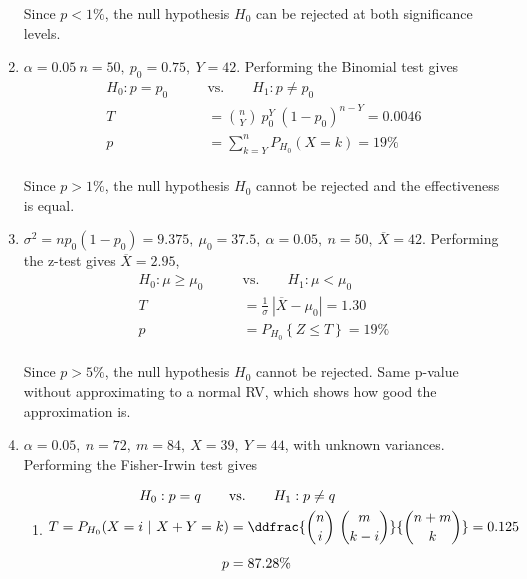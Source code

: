 \begin{enumerate}
	Since $ p < 1\% $, the null hypothesis $ H_0 $ can be rejected at both significance levels.\\
	
	\item $\alpha = 0.05\ n = 50,\ p_0 = 0.75,\ Y = 42$. Performing the Binomial test gives\\
	
	\begin{align}
		H_0 : p = p_0 \qquad &\text{vs.} \qquad H_1 : p \neq p_0 \nonumber \\
		T &= \binom{n}{Y}\ p_0^Y\ (1-p_0)^{n-Y}  = 0.0046 \nonumber \\
		p &= \sum\limits_{k = Y}^{n} P_{H_0}(X = k) = 19\%
	\end{align}\\
	
	Since $ p > 1\% $, the null hypothesis $ H_0 $ cannot be rejected and the effectiveness is equal.\\
	
	\item $ \sigma^2 = np_0(1-p_0) = 9.375,\ \mu_0 = 37.5,\ \alpha = 0.05,\ n = 50,\ \overline{X} = 42$. Performing the z-test gives $ \overline{X} = 2.95 $,\\
	
	\begin{align}
		H_0 : \mu \geq \mu_0 \qquad &\text{vs.} \qquad H_1 : \mu < \mu_0 \nonumber \\
		T &= \frac{1}{\sigma}\ |\overline{X} - \mu_0| = 1.30 \nonumber \\
		p &= P_{H_0}\left\{Z \leq T\right\} = 19\% 
	\end{align}\\
	Since $ p > 5\% $, the null hypothesis $ H_0 $ cannot be rejected. Same p-value without approximating to a normal RV, which shows how good the approximation is.\\
	
	\item $\alpha = 0.05,\ n = 72,\ m = 84,\ X = 39,\ Y = 44$, with unknown variances. Performing the Fisher-Irwin test gives\\
	
	\begin{enumerate}
		\item 
		\begin{align}
			H_0 : p  = q \qquad &\text{vs.} \qquad H_1 : p  \neq q \nonumber \\
			T = P_{H_0}(X = i\ |\ X+Y = k) &= \ddfrac{\binom{n}{i}\ \binom{m}{k-i}}{\binom{n+m}{k}} = 0.125 \nonumber \\[1ex]
			p &= 87.28\%
		\end{align}\\
		

\end{enumerate}
\end{enumerate}
